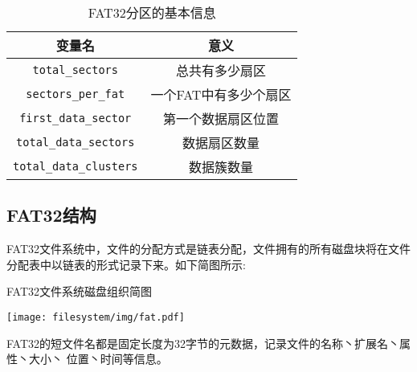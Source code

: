 \begin{table}[H]
  \centering
  \caption{FAT32分区的基本信息}
  \begin{tabular}{|c|c|}
  \hline
  变量名              & 意义                  \\
  \hline
  \texttt{total\_sectors}        & 总共有多少扇区        \\
  \hline
  \texttt{sectors\_per\_fat}     & 一个FAT中有多少个扇区 \\
  \hline
  \texttt{first\_data\_sector}   & 第一个数据扇区位置    \\
  \hline
  \texttt{total\_data\_sectors}  & 数据扇区数量          \\
  \hline
  \texttt{total\_data\_clusters} & 数据簇数量            \\
  \hline
  \end{tabular}
\end{table}






\subsection{FAT32结构}



FAT32文件系统中，文件的分配方式是链表分配，文件拥有的所有磁盘块将在文件分配表中以链表的形式记录下来。如下简图所示: 

\begin{table}[H]
  \centering
  \caption{FAT32文件系统磁盘组织简图}
  \texttt{[image: filesystem/img/fat.pdf]}
\end{table}





FAT32的短文件名都是固定长度为32字节的元数据，记录文件的名称丶扩展名丶属性丶大小丶 位置丶时间等信息。

